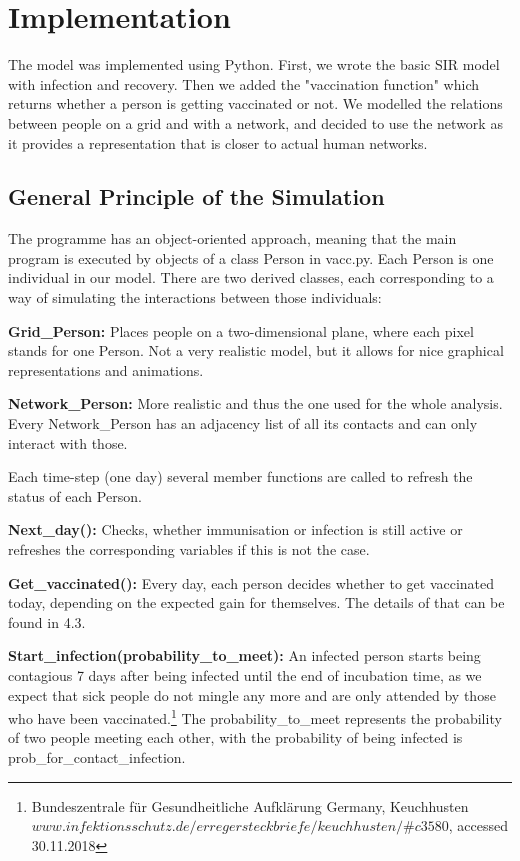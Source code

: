 \documentclass[11pt]{article}
\begin{document}
\section{Implementation}
The model was implemented using Python. First, we wrote the basic SIR model with infection and recovery. Then we added the "vaccination function" which returns whether a person is getting vaccinated or not. We modelled the relations between people on a grid and with a network, and decided to use the network as it provides a representation that is closer to actual human networks. 

\vspace{14px}

\subsection{General Principle of the Simulation}
The programme has an object-oriented approach, meaning that the main program is executed by objects of a class Person in vacc.py. Each Person is one individual in our model. There are two derived classes, each corresponding to a way of simulating the interactions between those individuals:
\vspace{14px}

\textbf{Grid\_Person:} Places people on a two-dimensional plane, where each pixel stands for one Person. Not a very realistic model, but it allows for nice graphical representations and animations.
\vspace{14px}

\textbf{Network\_Person:} More realistic and thus the one used for the whole analysis. Every Network\_Person has an adjacency list of all its contacts and can only interact with those.
\vspace{14px}

Each time-step (one day) several member functions are called to refresh the status of each Person.
\vspace{14px}

\textbf{Next\_day():} Checks, whether immunisation or infection is still active or refreshes the corresponding variables if this is not the case. 

\textbf{Get\_vaccinated():} Every day, each person decides whether to get vaccinated today, depending on the expected gain for themselves. The details of that can be found in 4.3. 

\textbf{Start\_infection(probability\_to\_meet):} An infected person starts being contagious 7 days after being infected until the end of incubation time, as we expect that sick people do not mingle any more and are only attended by those who have been vaccinated.\footnote{Bundeszentrale für Gesundheitliche Aufklärung Germany, Keuchhusten \break
$www.infektionsschutz.de/erregersteckbriefe/keuchhusten/\#c3580$, accessed 30.11.2018} The probability\_to\_meet represents the probability of two people meeting each other, with the probability of being infected is prob\_for\_contact\_infection.
\vspace{14px}
\end{document}
